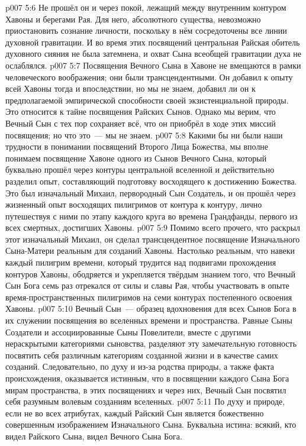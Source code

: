\vs p007 5:6 Не прошёл он и через покой, лежащий между внутренним контуром Хавоны и берегами Рая. Для него, абсолютного существа, невозможно приостановить сознание личности, поскольку в нём сосредоточены все линии духовной гравитации. И во время этих посвящений центральная Райская обитель духовного сияния не была затемнена, и охват Сына всеобщей гравитации духа не ослаблялся.
\vs p007 5:7 \pc Посвящения Вечного Сына в Хавоне не вмещаются в рамки человеческого воображения; они были трансцендентными. Он добавил к опыту всей Хавоны тогда и впоследствии, но мы не знаем, добавил ли он к предполагаемой эмпирической способности своей экзистенциальной природы. Это относится к тайне посвящения Райских Сынов. Однако мы верим, что Вечный Сын с тех пор сохраняет всё, что он приобрёл в ходе этих миссий посвящения; но что это~--- мы не знаем.
\vs p007 5:8 \pc Какими бы ни были наши трудности в понимании посвящений Второго Лица Божества, мы вполне понимаем посвящение Хавоне одного из Сынов Вечного Сына, который буквально прошёл через контуры центральной вселенной и действительно разделил опыт, составляющий подготовку восходящего к достижению Божества. Это был изначальный Михаил, первородный Сын Создатель, и он прошёл через жизненный опыт восходящих пилигримов от контура к контуру, лично путешествуя с ними по этапу каждого круга во времена Грандфанды, первого из всех смертных, достигших Хавоны.
\vs p007 5:9 Помимо всего прочего, что раскрыл этот изначальный Михаил, он сделал трансцендентное посвящение Изначального Сына\hyp{}Матери реальным для созданий Хавоны. Настолько реальным, что навеки каждый пилигрим времени, который трудится над подвигами прохождения контуров Хавоны, ободряется и укрепляется твёрдым знанием того, что Вечный Сын Бога семь раз отрекался от силы и славы Рая, чтобы участвовать в опыте время\hyp{}пространственных пилигримов на семи контурах постепенного освоения Хавоны.
\vs p007 5:10 \pc Вечный Сын~--- образец вдохновения для всех Сынов Бога в их служении посвящения во вселенных времени и пространства. Равные Сыны Создатели и ассоциированные Сыны Повелители, вместе с другими нераскрытыми категориями сыновства, разделяют эту замечательную готовность посвятить себя различным категориям созданной жизни и в качестве самих созданий. Следовательно, по духу и из\hyp{}за родства природы, а также факта происхождения, оказывается истинным, что в посвящении каждого Сына Бога мирам пространства, в этих посвящениях и через них, Вечный Сын посвятил себя разумным волевым созданиям вселенных.
\vs p007 5:11 По духу и природе, если не во всех атрибутах, каждый Райский Сын является божественно совершенным изображением Изначального Сына. Буквальна истина: всякий, кто видел Райского Сына, видел Вечного Сына Бога.
